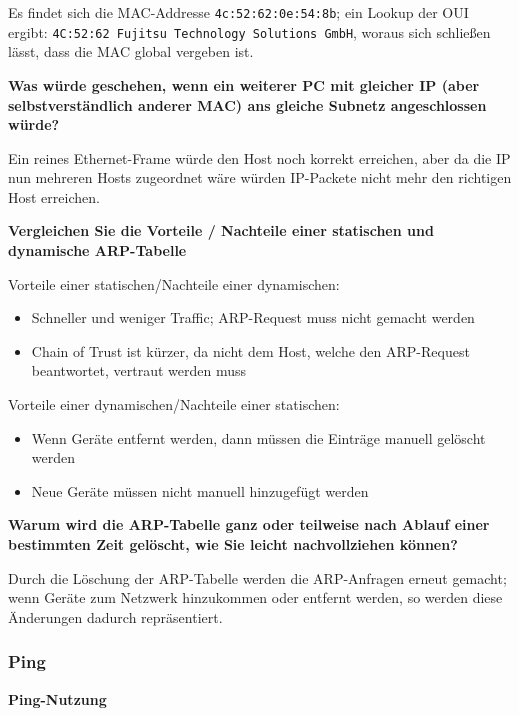 Es findet sich die MAC-Addresse \texttt{4c:52:62:0e:54:8b}; ein Lookup
der OUI ergibt: \texttt{4C:52:62\ Fujitsu\ Technology\ Solutions\ GmbH},
woraus sich schließen lässt, dass die MAC global vergeben ist.

\textbf{Was würde geschehen, wenn ein weiterer PC mit gleicher IP (aber
selbstverständlich anderer MAC) ans gleiche Subnetz angeschlossen
würde?}

Ein reines Ethernet-Frame würde den Host noch korrekt erreichen, aber da
die IP nun mehreren Hosts zugeordnet wäre würden IP-Packete nicht mehr
den richtigen Host erreichen.

\textbf{Vergleichen Sie die Vorteile / Nachteile einer statischen und
dynamische ARP-Tabelle}

Vorteile einer statischen/Nachteile einer dynamischen:

\begin{itemize}
\tightlist
\item
  Schneller und weniger Traffic; ARP-Request muss nicht gemacht werden
\item
  Chain of Trust ist kürzer, da nicht dem Host, welche den ARP-Request
  beantwortet, vertraut werden muss
\end{itemize}

Vorteile einer dynamischen/Nachteile einer statischen:

\begin{itemize}
\tightlist
\item
  Wenn Geräte entfernt werden, dann müssen die Einträge manuell gelöscht
  werden
\item
  Neue Geräte müssen nicht manuell hinzugefügt werden
\end{itemize}

\textbf{Warum wird die ARP-Tabelle ganz oder teilweise nach Ablauf einer
bestimmten Zeit gelöscht, wie Sie leicht nachvollziehen können?}

Durch die Löschung der ARP-Tabelle werden die ARP-Anfragen erneut
gemacht; wenn Geräte zum Netzwerk hinzukommen oder entfernt werden, so
werden diese Änderungen dadurch repräsentiert.

\hypertarget{ping}{%
\subsubsection{Ping}\label{ping}}

\textbf{Ping-Nutzung}

